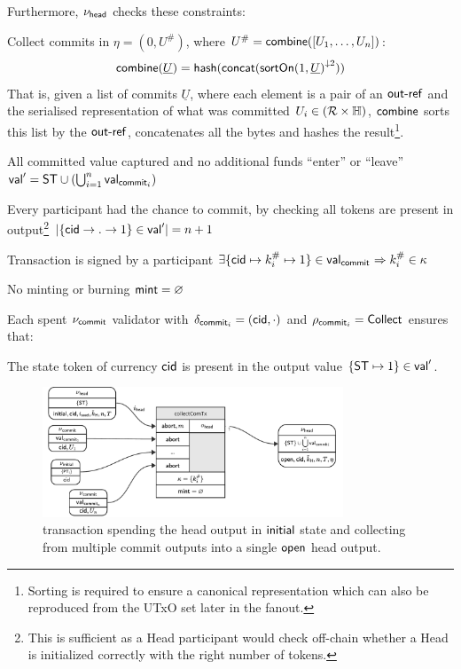 \begin{samepage}
	\noindent Furthermore, $\nu_\mathsf{head}$ checks these constraints:
	\begin{menumerate}
		\item Collect commits in $\eta = (0, U^{\#})$, where
		$U^{\#} = \mathsf{combine}([U_{1}, \dots, U_{n}])$:
		\[
			\mathsf{combine}(\underline{U}) = \mathsf{hash}(\mathsf{concat}({\mathsf{sortOn}(1, \underline{U})}^{\downarrow2}))
		\]
		That is, given a list of commits $\underline{U}$, where each element is a pair
		of an $\mathsf{out\textsf{-}{}ref}$ and the serialised representation of what was committed
		$U_{i} \in (\mathcal{R} \times \mathbb{H})$, $\mathsf{combine}$ sorts this list by the
		$\mathsf{out\textsf{-}{}ref}$, concatenates all the bytes and hashes the
		result\footnote{Sorting is required to ensure a canonical representation
			which can also be reproduced from the UTxO set later in the fanout.}.

		\item All committed value captured and no additional funds ``enter'' or ``leave''\\
		$\mathsf{val}' = \mathsf{ST} \cup (\bigcup_{i=1}^{n} \mathsf{val}_{\mathsf{commit}_{i}})$
		\item Every participant had the chance to commit, by checking all tokens are present in output\footnote{This is sufficient as a Head participant would check off-chain whether a Head is initialized correctly with the right number of tokens.}
		$|\{\mathsf{cid} \rightarrow . \rightarrow 1\} \in \mathsf{val}'| = n + 1$
		\item Transaction is signed by a participant $\exists \{\mathsf{cid} \mapsto k^{\#}_{i} \mapsto 1\} \in \mathsf{val}_{\mathsf{commit}_{}} \Rightarrow k^{\#}_{i} \in \kappa$
		\item No minting or burning  $\mathsf{mint} = \varnothing$
	\end{menumerate}
\end{samepage}

\noindent Each spent $\nu_{\mathsf{commit}}$ validator with $\delta_{\mathsf{commit}_{i}} = (\mathsf{cid},\cdot)$ and $\rho_{\mathsf{commit}_{i}} = \mathsf{Collect}$ ensures that:
\begin{menumerate}
	\item The state token of currency $\mathsf{cid}$ is present in the output value
	$\{\mathsf{ST} \mapsto 1\} \in \mathsf{val}'$.
\end{menumerate}

\begin{figure}[h]
	\centering
	\includegraphics[width=0.8\textwidth]{figures/collectComTx.pdf}
	\caption{\mtxCCom{} transaction spending the head output in $\mathsf{initial}$
		state and collecting from multiple commit outputs into a single
		$\mathsf{open}$ head output.}\label{fig:collectComTx}
\end{figure}

